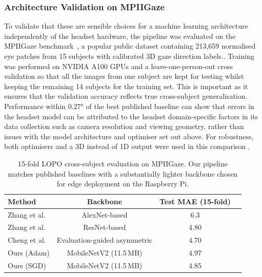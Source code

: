 \subsubsection{Architecture Validation on MPIIGaze}

To validate that these are sensible choices for a machine learning architecture independently of the headset hardware, the pipeline was evaluated on the MPIIGaze benchmark~\cite{zhang2015appearance}, a popular public dataset containing 213{,}659 normalised eye patches from 15 subjects with calibrated 3D gaze direction labels..  Training was performed on NVIDIA A100 GPUs and a leave-one-person-out cross validation so that all the images from one subject are kept for testing whilst keeping the remaining 14 subjects for the training set. This is important as it ensures that the validation accuracy reflects true cross-subject generalisation. Performance within 0.27° of the best published baseline can show that errors in the headset model can be attributed to the headset domain-specific factors in its data collection such as camera resolution and viewing geometry, rather than issues with the model architecture and optimiser set out above. For robustness, both optimisers and a 3D instead of 1D output were used in this comparison .

\begin{table}[htbp]
    \centering
    \caption{15-fold LOPO cross-subject evaluation on MPIIGaze. Our pipeline matches published baselines with a substantially lighter backbone chosen for edge deployment on the Raspberry Pi.}
    \label{tab:mpiigaze-results}
    \begin{tabular}{lccc}
        \toprule
        \textbf{Method} & \textbf{Backbone} & \textbf{Test MAE (15-fold)} \\
        \midrule
        Zhang et al.~\cite{zhang2015appearance} & AlexNet-based & 6.3\textdegree{} \\
        Zhang et al.~\cite{zhang2017appearance} & ResNet-based & 4.80\textdegree{} \\
        Cheng et al.~\cite{cheng2018appearance} & Evaluation-guided asymmetric & 4.70\textdegree{} \\
        Ours (Adam) & MobileNetV2 (11.5\,MB) & 4.97\textdegree{} \\
        Ours (SGD) & MobileNetV2 (11.5\,MB) & 4.85\textdegree{} \\
        \bottomrule
    \end{tabular}
\end{table}

